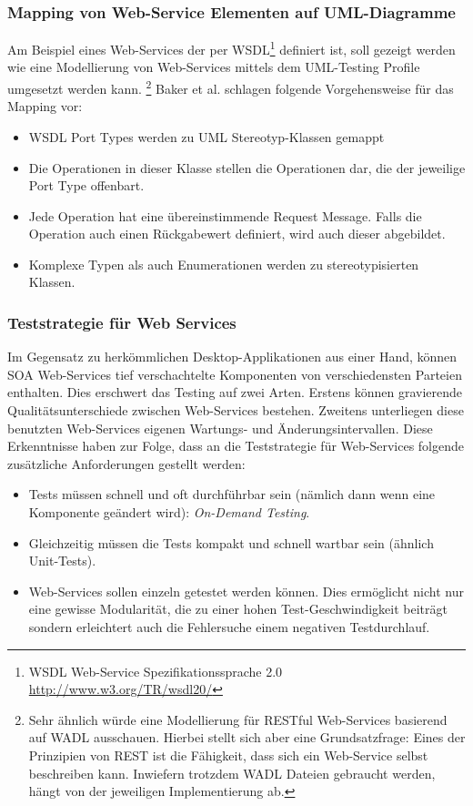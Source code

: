 \subsubsection{Mapping von Web-Service Elementen auf UML-Diagramme}
Am Beispiel eines Web-Services der per WSDL\footnote{WSDL Web-Service Spezifikationssprache 2.0 \url{http://www.w3.org/TR/wsdl20/}} definiert ist, soll gezeigt werden wie eine Modellierung von Web-Services mittels dem UML-Testing Profile umgesetzt werden kann. \footnote{Sehr ähnlich würde eine Modellierung für RESTful Web-Services basierend auf WADL ausschauen. Hierbei stellt sich aber eine Grundsatzfrage: Eines der Prinzipien von REST ist die Fähigkeit, dass sich ein Web-Service selbst beschreiben kann. Inwiefern trotzdem WADL Dateien gebraucht werden, hängt von der jeweiligen Implementierung ab.} Baker et al. schlagen folgende Vorgehensweise für das Mapping vor\cite{_model-driven_2007}:

\begin{itemize}
\item WSDL Port Types werden zu UML Stereotyp-Klassen gemappt
\item Die Operationen in dieser Klasse stellen die Operationen dar, die der jeweilige Port Type offenbart.
\item Jede Operation hat eine übereinstimmende Request Message. Falls die Operation auch einen Rückgabewert definiert, wird auch dieser abgebildet.
\item Komplexe Typen als auch Enumerationen werden zu stereotypisierten Klassen.
\end{itemize}

\subsubsection{Teststrategie für Web Services}
Im Gegensatz zu herkömmlichen Desktop-Applikationen aus einer Hand, können SOA Web-Services tief verschachtelte Komponenten von verschiedensten Parteien enthalten. Dies erschwert das Testing auf zwei Arten. Erstens können gravierende Qualitätsunterschiede zwischen Web-Services bestehen. Zweitens unterliegen diese benutzten Web-Services eigenen Wartungs- und Änderungsintervallen. Diese Erkenntnisse haben zur Folge, dass an die Teststrategie für Web-Services folgende zusätzliche Anforderungen gestellt werden:

\begin{itemize}
\item Tests müssen schnell und oft durchführbar sein (nämlich dann wenn eine Komponente geändert wird): \textit{On-Demand Testing}.
\item Gleichzeitig müssen die Tests kompakt und schnell wartbar sein (ähnlich Unit-Tests).
\item Web-Services sollen einzeln getestet werden können. Dies ermöglicht nicht nur eine gewisse Modularität, die zu einer hohen Test-Geschwindigkeit beiträgt sondern erleichtert auch die Fehlersuche einem negativen Testdurchlauf.
\end{itemize}

